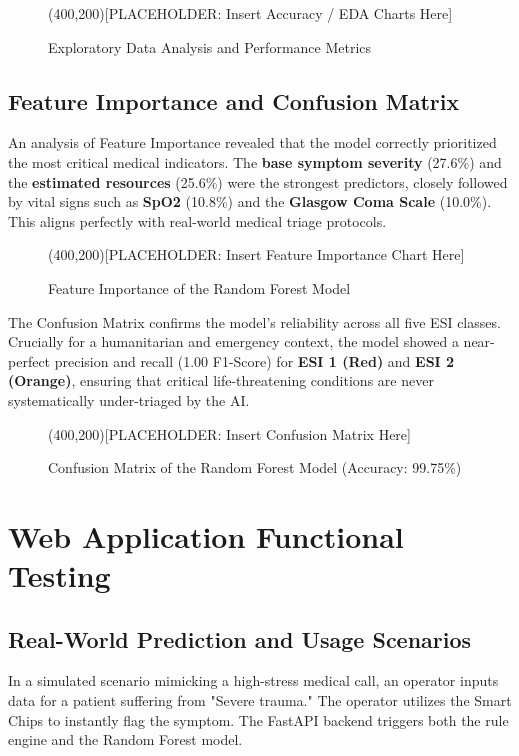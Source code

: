 \documentclass[a4paper,12pt,oneside]{report}
\begin{document}
\begin{figure}[H]
\centering
\framebox(400,200){[PLACEHOLDER: Insert Accuracy / EDA Charts Here]}
\caption{Exploratory Data Analysis and Performance Metrics}
\label{fig:training_acc}
\end{figure}

\subsection{Feature Importance and Confusion Matrix}
An analysis of Feature Importance revealed that the model correctly prioritized the most critical medical indicators. The \textbf{base symptom severity} (27.6\%) and the \textbf{estimated resources} (25.6\%) were the strongest predictors, closely followed by vital signs such as \textbf{SpO2} (10.8\%) and the \textbf{Glasgow Coma Scale} (10.0\%). This aligns perfectly with real-world medical triage protocols.

\begin{figure}[H]
\centering
\framebox(400,200){[PLACEHOLDER: Insert Feature Importance Chart Here]}
\caption{Feature Importance of the Random Forest Model}
\label{fig:feature_imp}
\end{figure}

The Confusion Matrix confirms the model's reliability across all five ESI classes. Crucially for a humanitarian and emergency context, the model showed a near-perfect precision and recall (1.00 F1-Score) for \textbf{ESI 1 (Red)} and \textbf{ESI 2 (Orange)}, ensuring that critical life-threatening conditions are never systematically under-triaged by the AI.

\begin{figure}[H]
\centering
\framebox(400,200){[PLACEHOLDER: Insert Confusion Matrix Here]}
\caption{Confusion Matrix of the Random Forest Model (Accuracy: 99.75\%)}
\label{fig:confusion}
\end{figure}

\section{Web Application Functional Testing}

\subsection{Real-World Prediction and Usage Scenarios}
In a simulated scenario mimicking a high-stress medical call, an operator inputs data for a patient suffering from "Severe trauma." The operator utilizes the Smart Chips to instantly flag the symptom. The FastAPI backend triggers both the rule engine and the Random Forest model. 
\end{document}
